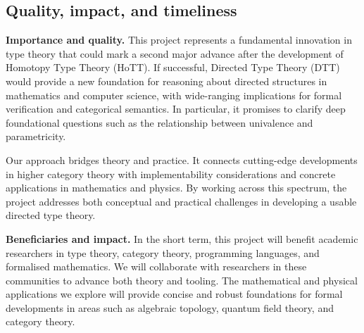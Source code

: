 \documentclass[a4paper,11pt]{article}
\renewcommand{\paragraph}[1]{\textbf{#1.}}
\begin{document}




\subsection{Quality, impact, and timeliness}

\paragraph{Importance and quality}
This project represents a fundamental innovation in type theory that
could mark a second major advance after the development of Homotopy
Type Theory (HoTT). If successful, Directed Type Theory (DTT) would
provide a new foundation for reasoning about directed structures in
mathematics and computer science, with wide-ranging implications for
formal verification and categorical semantics. In particular, it
promises to clarify deep foundational questions such as the
relationship between univalence and parametricity.

Our approach bridges theory and practice. It connects cutting-edge
developments in higher category theory with implementability
considerations and concrete applications in mathematics and
physics. By working across this spectrum, the project addresses both
conceptual and practical challenges in developing a usable directed
type theory.

\paragraph{Beneficiaries and impact}
In the short term, this project will benefit academic researchers in
type theory, category theory, programming languages, and formalised
mathematics. We will collaborate with researchers in these communities
to advance both theory and tooling. The mathematical and physical
applications we explore will provide concise and robust foundations
for formal developments in areas such as algebraic topology, quantum
field theory, and category theory.
\end{document}
